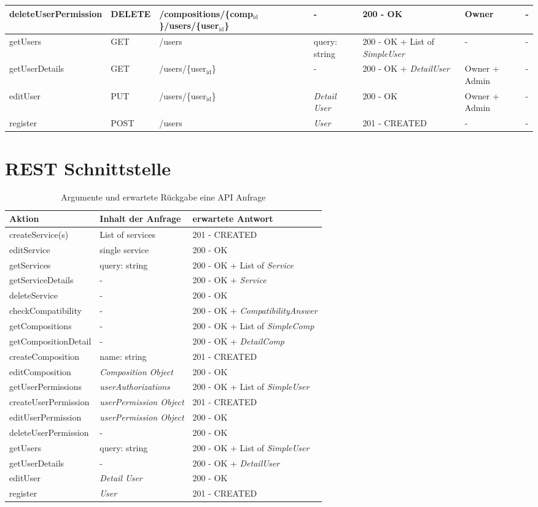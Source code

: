 \documentclass[11pt]{article}
\begin{document}
\begin{table}[htbp]
\begin{tabular}{lllllll}
deleteUserPermission & DELETE & /compositions/\{comp\(_{\text{id}}\)\}/users/\{user\(_{\text{id}}\)\} & - & 200 - OK & Owner & -\\
\hline
getUsers & GET & /users & query: string & 200 - OK + List of \emph{SimpleUser} & - & -\\
getUserDetails & GET & /users/\{user\(_{\text{id}}\)\} & - & 200 - OK + \emph{DetailUser} & Owner + Admin & -\\
editUser & PUT & /users/\{user\(_{\text{id}}\)\} & \emph{Detail User} & 200 - OK & Owner + Admin & -\\
register & POST & /users & \emph{User} & 201 - CREATED & - & -\\
\hline
\end{tabular}
\end{table}


\section{REST Schnittstelle}
\label{sec:org1844c6e}
\begin{table}[htbp]
\caption{Argumente und erwartete Rückgabe eine API Anfrage}
\centering
\begin{tabular}{lll}
Aktion & Inhalt der Anfrage & erwartete Antwort\\
\hline
createService(s) & List of services & 201 - CREATED\\
editService & single service & 200 - OK\\
getServices & query: string & 200 - OK + List of \emph{Service}\\
getServiceDetails & - & 200 - OK + \emph{Service}\\
deleteService & - & 200 - OK\\
\hline
checkCompatibility & - & 200 - OK + \emph{CompatibilityAnswer}\\
\hline
getCompositions & - & 200 - OK + List of \emph{SimpleComp}\\
getCompositionDetail & - & 200 - OK + \emph{DetailComp}\\
createComposition & name: string & 201 - CREATED\\
editComposition & \emph{Composition Object} & 200 - OK\\
\hline
getUserPermissions & \emph{userAuthorizations} & 200 - OK + List of \emph{SimpleUser}\\
createUserPermission & \emph{userPermission Object} & 201 - CREATED\\
editUserPermission & \emph{userPermission Object} & 200 - OK\\
deleteUserPermission & - & 200 - OK\\
\hline
getUsers & query: string & 200 - OK + List of \emph{SimpleUser}\\
getUserDetails & - & 200 - OK + \emph{DetailUser}\\
editUser & \emph{Detail User} & 200 - OK\\
register & \emph{User} & 201 - CREATED\\
\hline
\end{tabular}
\end{table}
\end{document}
